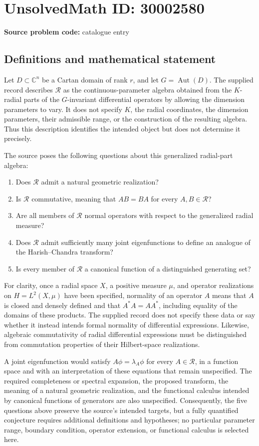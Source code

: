 \documentclass[11pt]{article}
\newcommand{\C}{\mathbb{C}}
\begin{document}
\section*{UnsolvedMath ID: 30002580}
\textbf{Source problem code:} catalogue entry
\subsection{Definitions and mathematical statement}
Let \(D\subset\C^n\) be a Cartan domain of rank \(r\), and let \(G=\operatorname{Aut}(D)\). The supplied record describes \(\mathcal R\) as the continuous-parameter algebra obtained from the \(K\)-radial parts of the \(G\)-invariant differential operators by allowing the dimension parameters to vary. It does not specify \(K\), the radial coordinates, the dimension parameters, their admissible range, or the construction of the resulting algebra. Thus this description identifies the intended object but does not determine it precisely.

The source poses the following questions about this generalized radial-part algebra:
\begin{enumerate}
\item Does \(\mathcal R\) admit a natural geometric realization?
\item Is \(\mathcal R\) commutative, meaning that \(AB=BA\) for every \(A,B\in\mathcal R\)?
\item Are all members of \(\mathcal R\) normal operators with respect to the generalized radial measure?
\item Does \(\mathcal R\) admit sufficiently many joint eigenfunctions to define an analogue of the Harish--Chandra transform?
\item Is every member of \(\mathcal R\) a canonical function of a distinguished generating set?
\end{enumerate}

For clarity, once a radial space \(X\), a positive measure \(\mu\), and operator realizations on \(H=L^2(X,\mu)\) have been specified, normality of an operator \(A\) means that \(A\) is closed and densely defined and that \(A^*A=AA^*\), including equality of the domains of these products. The supplied record does not specify these data or say whether it instead intends formal normality of differential expressions. Likewise, algebraic commutativity of radial differential expressions must be distinguished from commutation properties of their Hilbert-space realizations.

A joint eigenfunction would satisfy \(A\phi=\lambda_A\phi\) for every \(A\in\mathcal R\), in a function space and with an interpretation of these equations that remain unspecified. The required completeness or spectral expansion, the proposed transform, the meaning of a natural geometric realization, and the functional calculus intended by canonical functions of generators are also unspecified. Consequently, the five questions above preserve the source's intended targets, but a fully quantified conjecture requires additional definitions and hypotheses; no particular parameter range, boundary condition, operator extension, or functional calculus is selected here.
\end{document}
